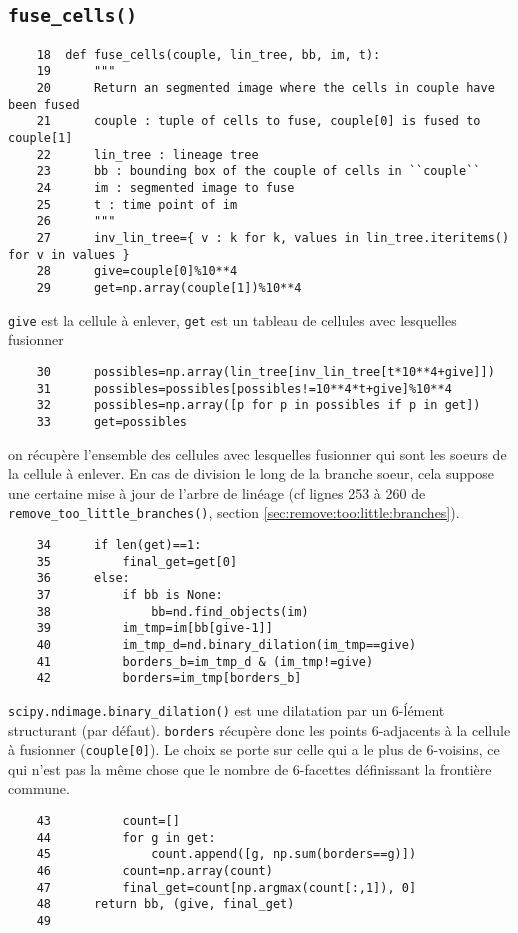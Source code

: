 \documentclass{article}
\def \mycolor {red}
\begin{document}
\subsection{\texttt{fuse\_cells()}}
\label{sec:fuse:cells}
\begin{verbatim}
    18	def fuse_cells(couple, lin_tree, bb, im, t):
    19	    """
    20	    Return an segmented image where the cells in couple have been fused
    21	    couple : tuple of cells to fuse, couple[0] is fused to couple[1]
    22	    lin_tree : lineage tree
    23	    bb : bounding box of the couple of cells in ``couple``
    24	    im : segmented image to fuse
    25	    t : time point of im
    26	    """
    27	    inv_lin_tree={ v : k for k, values in lin_tree.iteritems() for v in values }
    28	    give=couple[0]%10**4
    29	    get=np.array(couple[1])%10**4
\end{verbatim} 
\color{\mycolor}
\verb|give| est la cellule \`a enlever, \verb|get| est un tableau de cellules avec lesquelles fusionner
\color{black}
\begin{verbatim}
    30	    possibles=np.array(lin_tree[inv_lin_tree[t*10**4+give]])
    31	    possibles=possibles[possibles!=10**4*t+give]%10**4
    32	    possibles=np.array([p for p in possibles if p in get])
    33	    get=possibles
\end{verbatim} 
\color{\mycolor}
on r\'ecup\`ere l'ensemble des cellules avec lesquelles fusionner qui sont les soeurs de la cellule \`a enlever. En cas de division le long de la branche soeur, cela suppose une certaine mise \`a jour de l'arbre de lin\'eage (cf lignes 253 \`a 260 de \verb|remove_too_little_branches()|, section \ref{sec:remove:too:little:branches}).
\color{black}
\begin{verbatim}
    34	    if len(get)==1:
    35	        final_get=get[0]
    36	    else:
    37	        if bb is None:
    38	            bb=nd.find_objects(im)
    39	        im_tmp=im[bb[give-1]]
    40	        im_tmp_d=nd.binary_dilation(im_tmp==give)
    41	        borders_b=im_tmp_d & (im_tmp!=give)
    42	        borders=im_tmp[borders_b]
\end{verbatim} 
\color{\mycolor}
\texttt{scipy.ndimage.binary\_dilation()} est une dilatation par un 6-\'l\'ement structurant (par d\'efaut). \texttt{borders} r\'ecup\`ere donc les points 6-adjacents \`a la cellule \`a fusionner (\texttt{couple[0]}). Le choix se porte sur celle qui a le plus de 6-voisins, ce qui n'est pas la m\^eme chose que le nombre de 6-facettes d\'efinissant la fronti\`ere commune.
\color{black}
\begin{verbatim}
    43	        count=[]
    44	        for g in get:
    45	            count.append([g, np.sum(borders==g)])
    46	        count=np.array(count)
    47	        final_get=count[np.argmax(count[:,1]), 0]
    48	    return bb, (give, final_get)
    49	    
\end{verbatim}
\end{document}
